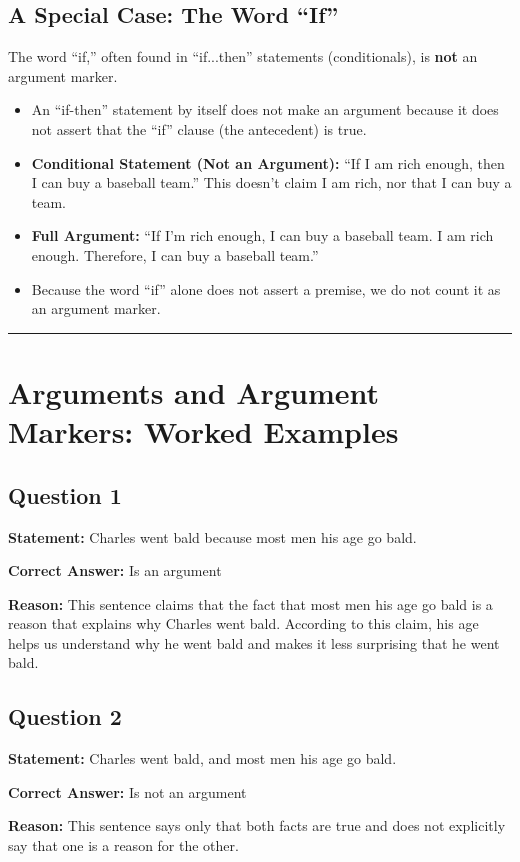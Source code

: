 \documentclass[12pt]{article}
\newcommand{\separator}{\noindent\rule{\linewidth}{1pt}}
\begin{document}
\subsection{A Special Case: The Word ``If''}
The word ``if,'' often found in ``if...then'' statements (conditionals), is \textbf{not} an argument marker.
\begin{itemize}
    \item An ``if-then'' statement by itself does not make an argument because it does not assert that the ``if'' clause (the antecedent) is true.
    \item \textbf{Conditional Statement (Not an Argument):} ``If I am rich enough, then I can buy a baseball team.'' This doesn't claim I am rich, nor that I can buy a team.
    \item \textbf{Full Argument:} ``If I'm rich enough, I can buy a baseball team. I am rich enough. Therefore, I can buy a baseball team.''
    \item Because the word ``if'' alone does not assert a premise, we do not count it as an argument marker.
\end{itemize}

\separator
\section{Arguments and Argument Markers: Worked Examples}

\subsection*{Question 1}
\textbf{Statement:}
Charles went bald because most men his age go bald.

\textbf{Correct Answer:} Is an argument

\textbf{Reason:}
This sentence claims that the fact that most men his age go bald is a reason that explains why Charles went bald. According to this claim, his age helps us understand why he went bald and makes it less surprising that he went bald.

\subsection*{Question 2}
\textbf{Statement:}
Charles went bald, and most men his age go bald.

\textbf{Correct Answer:} Is not an argument

\textbf{Reason:}
This sentence says only that both facts are true and does not explicitly say that one is a reason for the other.
\end{document}
